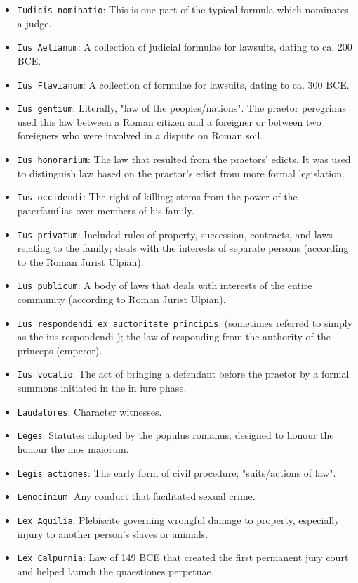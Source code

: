 \documentclass[11pt]{article}
\begin{document}
\begin{itemize}
\item \texttt{Iudicis nominatio}: This is one part of the typical formula which nominates a judge.
\item \texttt{Ius Aelianum}: A collection of judicial formulae for lawsuits, dating to ca. 200 BCE.
\item \texttt{Ius Flavianum}: A collection of formulae for lawsuits, dating to ca. 300 BCE.
\item \texttt{Ius gentium}: Literally, "law of the peoples/nations". The praetor peregrinus used this law between a Roman citizen and a foreigner or between two foreigners who were involved in a dispute on Roman soil.
\item \texttt{Ius honorarium}: The law that resulted from the praetors' edicts. It was used to distinguish law based on the praetor's edict from more formal legislation.
\item \texttt{Ius occidendi}: The right of killing; stems from the power of the paterfamilias over members of his family.
\item \texttt{Ius privatum}: Included rules of property, succession, contracts, and laws relating to the family; deals with the interests of separate persons (according to the Roman Jurist Ulpian).
\item \texttt{Ius publicum}: A body of laws that deals with interests of the entire community (according to Roman Jurist Ulpian).
\item \texttt{Ius respondendi ex auctoritate principis}: (sometimes referred to simply as the ius respondendi ); the law of responding from the authority of the princeps (emperor).
\item \texttt{Ius vocatio}: The act of bringing a defendant before the praetor by a formal summons initiated in the in iure phase.
\item \texttt{Laudatores}: Character witnesses.
\item \texttt{Leges}: Statutes adopted by the populus romanus; designed to honour the honour the mos maiorum.
\item \texttt{Legis actiones}: The early form of civil procedure; "suits/actions of law".
\item \texttt{Lenocinium}: Any conduct that facilitated sexual crime.
\item \texttt{Lex Aquilia}: Plebiscite governing wrongful damage to property, especially injury to another person's slaves or animals.
\item \texttt{Lex Calpurnia}: Law of 149 BCE that created the first permanent jury court and helped launch the quaestiones perpetuae.

\end{itemize}
\end{document}
